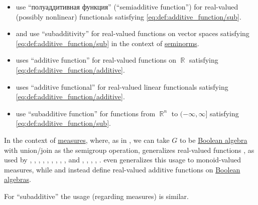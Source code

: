 \begin{remark}
\begin{itemize}
    \item {} use \enquote{полуаддитивная функция} (\enquote{semiadditive function}) for real-valued (possibly nonlinear) functionals satisfying \eqref{eq:def:additive_function/sub}.

    \item {} and  use \enquote{subadditivity} for real-valued functions on vector spaces satisfying \eqref{eq:def:additive_function/sub} in the context of \hyperref[def:seminorm]{seminorms}.

    \item {} uses \enquote{additive function} for real-valued functions on \( \BbbR \) satisfying \eqref{eq:def:additive_function/additive}.

    \item {} uses \enquote{additive functional} for real-valued linear functionals satisfying \eqref{eq:def:additive_function/additive}.

    \item {} use \enquote{subadditive function} for functions from \( \BbbR^n \) to \( (-\infty, \infty] \) satisfying \eqref{eq:def:additive_function/sub}.
  \end{itemize}

  In the context of \hyperref[def:measure]{measures}, where, as in , we can take \( G \) to be \hyperref[def:boolean_algebra]{Boolean algebra} with union/join as the semigroup operation,  generalizes  real-valued functions , as used by
  ,
  ,
  ,
  ,
  ,
  ,
  ,
  ,
  ,
   and
  ,
  ,
  ,
  ,
  .
   even generalizes this usage to monoid-valued measures, while  and  instead define real-valued additive functions on \hyperref[def:boolean_algebra]{Boolean algebras}.

  For \enquote{subadditive} the usage (regarding measures) is similar.
\end{remark}

